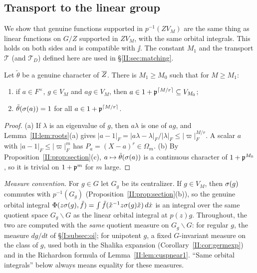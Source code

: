 \subsection{Transport to the linear group}\label{II:subsec:transport}
We show that genuine functions supported in $p^{-1}(ZV_M)$ are the same thing as linear functions on $G/Z$ supported in $ZV_M$, with the same orbital integrals. This holds on both sides and is compatible with $\jj$. The constant $M_1$ and the transport $\mathcal T$ (and $\mathcal T_D$) defined here are used in \S\ref{II:sec:matching}.

\begin{lemma}[Choice of $M$]\label{II:lem:chooseM}
Let $\tilde\theta$ be a genuine character of $\overline{Z}$. There is $M_1\ge M_0$ such that for $M\ge M_1$:
\begin{enumerate}[label=(\alph*)]
\item if $a\in F^\times$, $g\in V_M$ and $ag\in V_M$, then $a\in1+\mathfrak{p}^{\lceil M/r\rceil}\subseteq V_{M_0}$;
\item $\tilde\theta(\sigma(a))=1$ for all $a\in1+\mathfrak{p}^{\lceil M/r\rceil}$.
\end{enumerate}
\end{lemma}
\begin{proof}
(a) If $\lambda$ is an eigenvalue of $g$, then $a\lambda$ is one of $ag$, and Lemma~\ref{II:lem:roots}(a) gives $|a-1|_F=|a\lambda-\lambda|_F/|\lambda|_F\le|\varpi|_F^{M/r}$. A scalar $a$ with $|a-1|_F\le|\varpi|_F^m$ has $P_a=(X-a)^r\in\Omega_m$. (b) By Proposition~\ref{II:prop:section}(c), $a\mapsto\tilde\theta(\sigma(a))$ is a continuous character of $1+\mathfrak{p}^{M_0}$, so it is trivial on $1+\mathfrak{p}^m$ for $m$ large.
\end{proof}

\emph{Measure convention.} For $g\in G$ let $G_g$ be its centralizer. If $g\in V_M$, then $\sigma(g)$ commutes with $p^{-1}(G_g)$ (Proposition~\ref{II:prop:section}(b)), so the genuine orbital integral $\Phi(z\sigma(g),\tilde f)=\int\tilde f(\tilde x^{-1}z\sigma(g)\tilde x)\,d\dot x$ is an integral over the same quotient space $G_g\backslash G$ as the linear orbital integral at $p(z)g$. Throughout, the two are computed with the \emph{same} quotient measure on $G_g\backslash G$: for regular $g$, the measure $dg/dt$ of \S\ref{I:subsec:oi}; for unipotent $g$, a fixed $G$-invariant measure on the class of $g$, used both in the Shalika expansion (Corollary~\ref{II:cor:germexp}) and in the Richardson formula of Lemma~\ref{II:lem:cuspnear1}. ``Same orbital integrals'' below always means equality for these measures.


